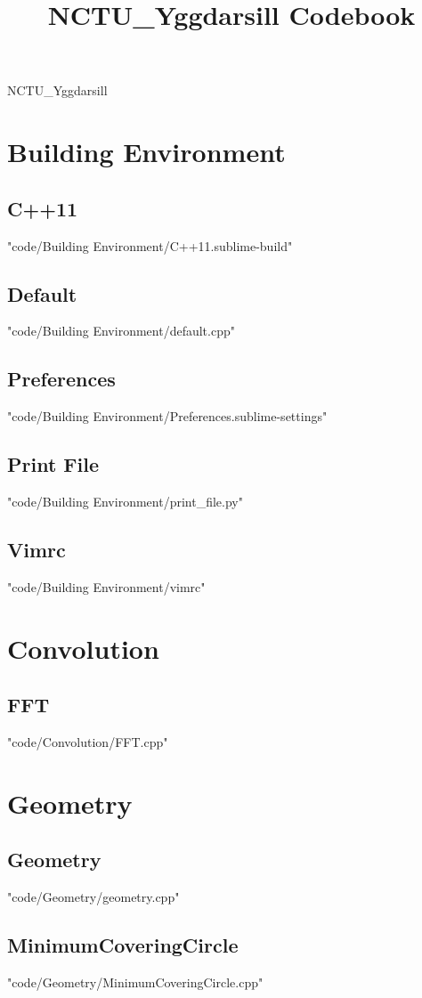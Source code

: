 \documentclass [landscape,8pt,a4paper,twocolumn]{article}
\title {NCTU\_Yggdarsill Codebook}
\begin{document}
\thispagestyle{fancy}
{ \Huge NCTU\_Yggdarsill}
\tableofcontents

\section{Building Environment}
\subsection{C++11}
 {"code/Building Environment/C++11.sublime-build"}
\subsection{Default}
 {"code/Building Environment/default.cpp"}
\subsection{Preferences}
 {"code/Building Environment/Preferences.sublime-settings"}
\subsection{Print File}
 {"code/Building Environment/print_file.py"}
\subsection{Vimrc}
 {"code/Building Environment/vimrc"}
\section{Convolution}
\subsection{FFT}
 {"code/Convolution/FFT.cpp"}
\section{Geometry}
\subsection{Geometry}
 {"code/Geometry/geometry.cpp"}
\subsection{MinimumCoveringCircle}
 {"code/Geometry/MinimumCoveringCircle.cpp"}
\end{document}

